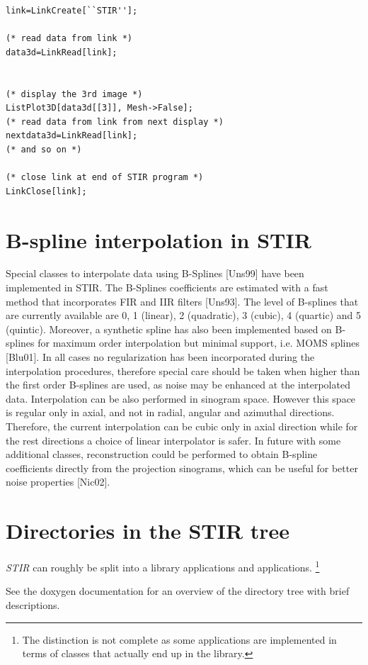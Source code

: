 \documentclass{article}
\begin{document}
{{{{{{\begin{verbatim}
link=LinkCreate[``STIR''];

(* read data from link *)
data3d=LinkRead[link];


(* display the 3rd image *)
ListPlot3D[data3d[[3]], Mesh->False];
(* read data from link from next display *)
nextdata3d=LinkRead[link];
(* and so on *)

(* close link at end of STIR program *)
LinkClose[link];
\end{verbatim}


\section{B-spline interpolation in STIR}

\label{sec:BSplines}
Special classes to interpolate data using B-Splines [Uns99] have been implemented in STIR. 
The B-Splines coefficients are estimated with a fast method that incorporates FIR and IIR 
filters [Uns93]. The level of B-splines that are currently available are 0, 1 (linear), 
2 (quadratic), 3 (cubic), 4 (quartic) and 5 (quintic). Moreover, a synthetic spline has also been 
implemented based on B-splines for maximum order interpolation but minimal support, i.e. MOMS 
splines [Blu01]. In all cases no regularization has been incorporated during the interpolation 
procedures, therefore special care should be taken when higher than the first order B-splines 
are used, as noise may be enhanced at the interpolated data. Interpolation can be also performed 
in sinogram space. However this space is regular only in axial, and not in radial, angular and 
azimuthal directions. Therefore, the current interpolation can be cubic only in axial direction 
while for the rest directions a choice of linear interpolator is safer. In future with some 
additional classes, reconstruction could be performed to obtain B-spline coefficients directly 
from the projection sinograms, which can be useful for better noise properties [Nic02].

\section{
Directories in the STIR tree}
\textit{STIR} can roughly be split into a library applications and applications.
\footnote{The distinction is not complete as some applications are implemented
in terms of classes that actually end up in the library.}

See the doxygen documentation for an overview of the directory tree with brief descriptions.

}}}}}}
\end{document}
